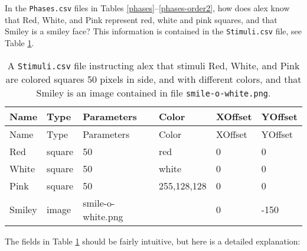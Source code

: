 \documentclass[11pt,]{article}
\begin{document}
In the \texttt{Phases.csv} files in Tables
\ref{phases}--\ref{phases-order2}, how does alex know that Red, White,
and Pink represent red, white and pink squares, and that Smiley is a
smiley face? This information is contained in the \texttt{Stimuli.csv}
file, see Table \ref{stimuli}.

\begin{longtable}[c]{@{}llllll@{}}
\caption{A \texttt{Stimuli.csv} file instructing alex that stimuli Red,
White, and Pink are colored squares 50 pixels in side, and with
different colors, and that Smiley is an image contained in file
\texttt{smile-o-white.png}. \label{stimuli}}\tabularnewline
\toprule
Name & Type & Parameters & Color & XOffset & YOffset\tabularnewline
\midrule
\endfirsthead
\toprule
Name & Type & Parameters & Color & XOffset & YOffset\tabularnewline
\midrule
\endhead
Red & square & 50 & red & 0 & 0\tabularnewline
White & square & 50 & white & 0 & 0\tabularnewline
Pink & square & 50 & 255,128,128 & 0 & 0\tabularnewline
Smiley & image & smile-o-white.png & & 0 & -150\tabularnewline
\bottomrule
\end{longtable}

The fields in Table \ref{stimuli} should be fairly intuitive, but here
is a detailed explanation:
\end{document}
